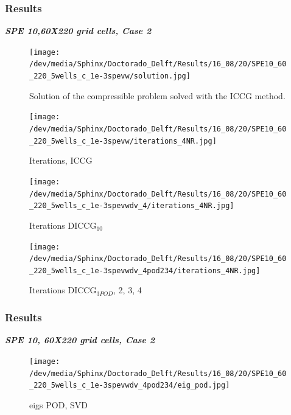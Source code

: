 \documentclass{beamer}
\begin{document}
\begin{frame}[shrink=5]
\frametitle{Results}
\emph{\Large \textbf{SPE 10,60X220 grid cells, Case 2}}
\begin{figure}[!h]
\centering 
\begin{minipage}{.45\textwidth}
 \centering
\texttt{[image: /dev/media/Sphinx/Doctorado\_Delft/Results/16\_08/20/SPE10\_60\_220\_5wells\_c\_1e-3spevw/solution.jpg]}
\caption{Solution of the compressible problem solved with the ICCG method.}
\label{fig:compsol}
\end{minipage}%
\hspace{10mm}
\begin{minipage}{.45\textwidth}
 \centering
\texttt{[image: /dev/media/Sphinx/Doctorado\_Delft/Results/16\_08/20/SPE10\_60\_220\_5wells\_c\_1e-3spevw/iterations\_4NR.jpg]}
\caption{Iterations, ICCG}
\label{fig:NR_IC}
\end{minipage}
\end{figure}
\begin{figure}[!h]
\centering
\begin{minipage}{.4\textwidth}
 \centering
\texttt{[image: /dev/media/Sphinx/Doctorado\_Delft/Results/16\_08/20/SPE10\_60\_220\_5wells\_c\_1e-3spevwdv\_4/iterations\_4NR.jpg]}
\caption{Iterations DICCG$_{10}$}
\label{fig:NR_D10}
\end{minipage}%
\hspace{15mm}
\begin{minipage}{.4\textwidth}
 \centering
\texttt{[image: /dev/media/Sphinx/Doctorado\_Delft/Results/16\_08/20/SPE10\_60\_220\_5wells\_c\_1e-3spevwdv\_4pod234/iterations\_4NR.jpg]}
\caption{Iterations DICCG$_{3POD}$, 2, 3, 4}
\label{fig:NR_POD5}
\end{minipage}
\end{figure}
\end{frame}
\begin{frame}[shrink=10]
\frametitle{Results}

\emph{\textbf{SPE 10, 60X220 grid cells, Case 2}}\\
\begin{figure}

\begin{minipage}{.45\textwidth}
 \centering
\texttt{[image: /dev/media/Sphinx/Doctorado\_Delft/Results/16\_08/20/SPE10\_60\_220\_5wells\_c\_1e-3spevwdv\_4pod234/eig\_pod.jpg]}
\caption{eigs POD, SVD}
\label{fig:NR_IC}
\end{minipage}
\end{figure}

\end{frame}
\end{document}
